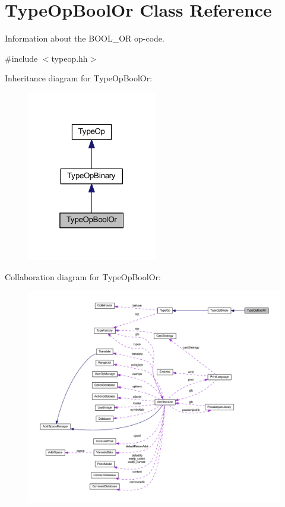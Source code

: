 \hypertarget{class_type_op_bool_or}{}\section{Type\+Op\+Bool\+Or Class Reference}
\label{class_type_op_bool_or}


Information about the B\+O\+O\+L\+\_\+\+OR op-\/code.  




{\ttfamily \#include $<$typeop.\+hh$>$}



Inheritance diagram for Type\+Op\+Bool\+Or\+:
\nopagebreak
\begin{figure}[H]
\begin{center}
\leavevmode
\includegraphics[width=160pt]{class_type_op_bool_or__inherit__graph}
\end{center}
\end{figure}


Collaboration diagram for Type\+Op\+Bool\+Or\+:
\nopagebreak
\begin{figure}[H]
\begin{center}
\leavevmode
\includegraphics[width=350pt]{class_type_op_bool_or__coll__graph}
\end{center}
\end{figure}
